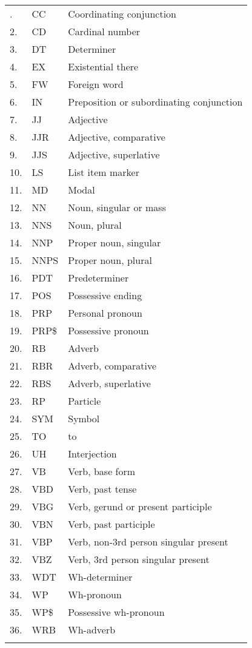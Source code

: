\begin{longtable}{|l|l|l|}
\hline \hline
\endlastfoot
 1. & CC & Coordinating conjunction \\
	 2. & CD & Cardinal number\\
	 3. & DT & Determiner \\
	4.&  EX &	Existential there\\
	5.&	FW &	Foreign word\\
	6.&	IN &	Preposition or subordinating conjunction\\
	7.&	JJ &	Adjective\\
	8.&	JJR &	Adjective, comparative\\
	9.&	JJS &	Adjective, superlative\\
	10.& LS &	List item marker\\
	11.& MD &	Modal\\
	12.& NN &	Noun, singular or mass\\
	13.& NNS &	Noun, plural\\
	14.& NNP &	Proper noun, singular\\
	15.& NNPS &	Proper noun, plural\\
	16.& PDT & Predeterminer\\
	17.& POS & Possessive ending\\
	18. & PRP & Personal pronoun \\
	19.& PRP\$ & Possessive pronoun\\
	20.& RB & Adverb\\
	21.& RBR & Adverb, comparative\\
	22.& RBS & Adverb, superlative\\
	23.& RP & Particle\\
	24.& SYM & Symbol\\
	25.& TO & to\\
	26.& UH & Interjection\\
	27.& VB & Verb, base form\\
	28.& VBD & Verb, past tense\\
	29.& VBG & Verb, gerund or present participle\\
	30.& VBN & Verb, past participle\\
	31.& VBP & Verb, non-3rd person singular present\\
	32.& VBZ & Verb, 3rd person singular present\\
	33.& WDT & Wh-determiner\\
	34.& WP & Wh-pronoun\\
	35.& WP\$ & Possessive wh-pronoun\\
	36.& WRB & Wh-adverb	\\

	  \label{table:POSTAGS}
\end{longtable}



